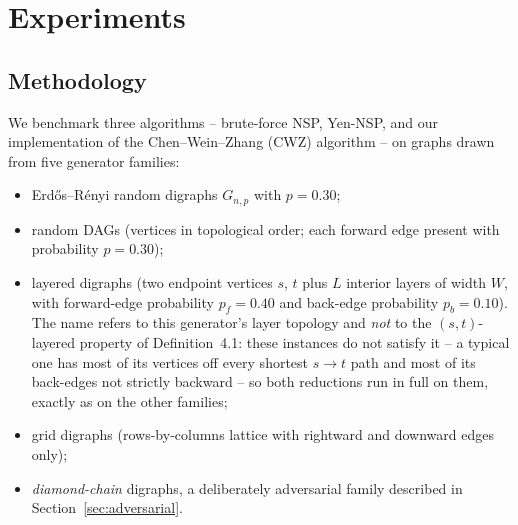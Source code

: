\chapter{Experiments}
\label{ch:experiments}

\section{Methodology}
\label{sec:methodology}

We benchmark three algorithms -- brute-force NSP, Yen-NSP, and our
implementation of the Chen--Wein--Zhang (CWZ) algorithm -- on graphs
drawn from five generator families:
\begin{itemize}
  \item Erd\H{o}s--R\'enyi random digraphs $G_{n,p}$ with $p=0.30$;
  \item random DAGs (vertices in topological order; each forward edge
    present with probability $p=0.30$);
  \item layered digraphs (two endpoint vertices $s$, $t$ plus $L$ interior
    layers of width $W$, with forward-edge probability $p_f=0.40$ and
    back-edge probability $p_b=0.10$). The name refers to this generator's
    layer topology and \emph{not} to the $(s,t)$-layered property of
    Definition~4.1: these instances do not satisfy it -- a typical one has
    most of its vertices off every shortest $s\to t$ path and most of its
    back-edges not strictly backward -- so both reductions run in full on
    them, exactly as on the other families;
  \item grid digraphs (rows-by-columns lattice with rightward and downward
    edges only);
  \item \emph{diamond-chain} digraphs, a deliberately adversarial family
    described in Section~\ref{sec:adversarial}.
\end{itemize}

